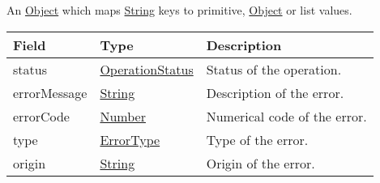 \documentclass[a4paper]{arrowhead}
\newcommand{\pref}[1]{{\textcolor{ArrowheadGrey}{\hyperref[sec:model:primitives:#1]{#1}}}}
\begin{document}

An \pref{Object} which maps \pref{String} keys to primitive, \pref{Object} or list values.


\begin{table}[ht!]
\begin{tabularx}{\textwidth}{| p{4.25cm} | p{3.5cm} | X |} \hline
\rowcolor{gray!33} Field & Type      & Description \\ \hline
status & \pref{OperationStatus} & Status of the operation. \\ \hline
errorMessage & \pref{String} & Description of the error. \\ \hline
errorCode &\pref{Number}  & Numerical code of the error. \\ \hline
type & \pref{ErrorType} & Type of the error. \\ \hline
origin & \pref{String} & Origin of the error. \\ \hline
\end{tabularx}
\end{table}

\clearpage

\end{document}
